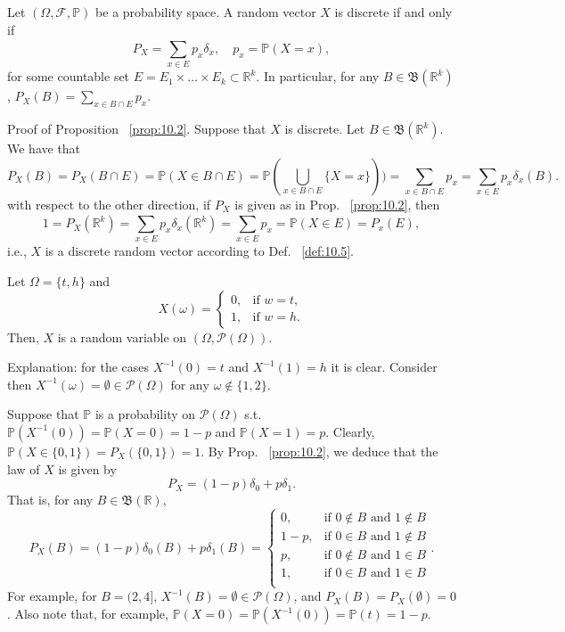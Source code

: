\begin{proposition}
    \label{prop:10.2}
    Let $(\Omega, \mathcal{F}, \mathbb{P})$ be a probability space. A random vector $X$ is discrete if
    and only if
    \[
    P_X = \sum_{x \in E}^{} p_x {\delta}_x, \quad p_x = \mathbb{P}(X = x)
    ,\] 
    for some countable set $E = E_1 \times \ldots \times E_k \subset \mathbb{R}^{k}$. In particular, for
    any $B \in  \mathfrak{B}(\mathbb{R}^{k})$, $P_X(B) = \sum_{x \in B \cap E}^{} p_x$.
\end{proposition}

Proof of Proposition ~\ref{prop:10.2}. Suppose that $X$ is discrete. Let $B \in 
\mathfrak{B}(\mathbb{R}^{k})$. We have that
\[
P_X(B) = P_X(B \cap E) = \mathbb{P}(X \in B \cap E) 
= \mathbb{P}(\bigcup_{x \in B \cap E}\{X = x\} ) ) = \sum_{x \in B\cap E}^{ } p_x
= \sum_{x \in E}^{ } p_x {\delta}_x(B)
.\] 
with respect to the other direction, if $P_X$ is given as in Prop. ~\ref{prop:10.2}, then
\[
1 = P_X(\mathbb{R}^{k}) = \sum_{x \in E}^{ } p_x {\delta}_x(\mathbb{R}^{k})
= \sum_{x \in E}^{ } p_x = \mathbb{P}(X \in E) = P_x(E)
,\] 
i.e., $X$ is a discrete random vector according to Def. ~\ref{def:10.5}.

\begin{example}
    \label{ex:Tail,_head}
    Let $\Omega = \{t, h\} $ and
    \[
    X(\omega) = 
    \begin{cases}
        0, & \text{if } w=t, \\
        1, & \text{if } w = h.
    \end{cases}
    \] 
    Then, $X$ is a random variable on $(\Omega, \mathcal{P}(\Omega))$.

    Explanation: for the cases $X^{-1}(0) = t$ and $X^{-1}(1) = h$ it is clear. Consider then 
    $X^{-1}(\omega) = \emptyset \in \mathcal{P}(\Omega) \text{ for any } \omega \not\in \{1, 2\} $.

    Suppose that $\mathbb{P}$ is a probability on $\mathcal{P}(\Omega)$ s.t. $\mathbb{P}(X^{-1}(0)) 
    = \mathbb{P}(X=0) = 1-p$ and $\mathbb{P}(X=1)=p$.     
    Clearly, $\mathbb{P}(X \in \{0,1\} ) = P_X(\{0,1\} ) = 1$. By Prop. ~\ref{prop:10.2}, we deduce
    that the law of $X$ is given by
    \[
    P_X = (1-p) \delta _0 + p\delta _1
    .\] 
    That is, for any $B \in \mathfrak{B}(\mathbb{R})$,
    \[
    P_X(B)= (1-p) \delta _0(B) + p\delta _1(B)=
    \begin{cases}
        0, & \text{if } 0 \not\in B \text{ and } 1 \not\in B \\
        1-p, & \text{if } 0 \in B \text{ and } 1 \not\in B \\
        p, & \text{if } 0 \not\in B \text{ and } 1 \in B \\
        1, & \text{if } 0 \in B \text{ and } 1 \in B \\
    \end{cases}
    .\] 
    For example, for $B = (2, 4]$, $X^{-1}(B) = \emptyset \in \mathcal{P}(\Omega)$, and
    $P_X(B) = P_X(\emptyset) = 0$. Also note that, for example, $\mathbb{P}(X=0) 
    = \mathbb{P}(X^{-1}(0)) = \mathbb{P}(t) = 1-p$.

\end{example}

